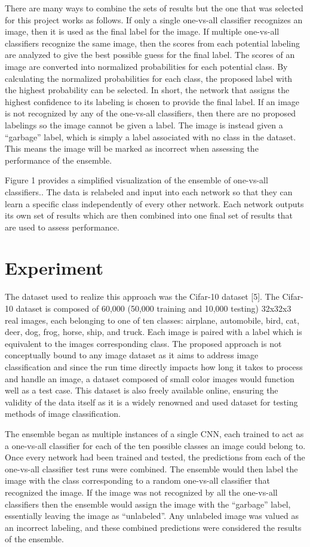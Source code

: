 \documentclass[10pt,twocolumn,letterpaper]{article}
\begin{document}
There are many ways to combine the sets of results but the one that was selected for this project works as follows. If only a single one-vs-all classifier recognizes an image, then it is used as the final label for the image. If multiple one-vs-all classifiers recognize the same image, then the scores from each potential labeling are analyzed to give the best possible guess for the final label. The scores of an image are converted into normalized probabilities for each potential class. By calculating the normalized probabilities for each class, the proposed label with the highest probability can be selected. In short, the network that assigns the highest confidence to its labeling is chosen to provide the final label. If an image is not recognized by any of the one-vs-all classifiers, then there are no proposed labelings so the image cannot be given a label. The image is instead given a “garbage” label, which is simply a label associated with no class in the dataset. This means the image will be marked as incorrect when assessing the performance of the ensemble.

Figure 1 provides a simplified visualization of the ensemble of one-vs-all classifiers.. The data is relabeled and input into each network so that they can learn a specific class independently of every other network. Each network outputs its own set of results which are then combined into one final set of results that are used to assess performance.

\section{Experiment}
The dataset used to realize this approach was the Cifar-10 dataset [5]. The Cifar-10 dataset is composed of 60,000 (50,000 training and 10,000 testing) 32x32x3 real images, each belonging to one of ten classes: airplane, automobile, bird, cat, deer, dog, frog, horse, ship, and truck. Each image is paired with a label which is equivalent to the images corresponding class. The proposed approach is not conceptually bound to any image dataset as it aims to address image classification and since the run time directly impacts how long it takes to process and handle an image, a dataset composed of small color images would function well as a test case. This dataset is also freely available online, ensuring  the validity of the data itself as it is a widely renowned and used dataset for testing methods of image classification.

The ensemble began as multiple instances of a single CNN, each trained to act as a one-vs-all classifier for each of the ten possible classes an image could belong to. Once every network had been trained and tested, the predictions from each of the one-vs-all classifier test runs were combined. The ensemble would then label the image with the class corresponding to a random one-vs-all classifier that recognized the image. If the image was not recognized by all the one-vs-all classifiers then the ensemble would assign the image with the “garbage” label, essentially leaving the image as “unlabeled”. Any unlabeled image was valued as an incorrect labeling, and these combined predictions were considered the results of the ensemble.
\end{document}
